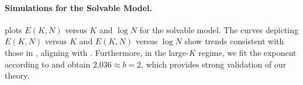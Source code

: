 \paragraph{Simulations for the Solvable Model.}  plots $E(K, N)$ versus $K$ and $\log N$ for the solvable model. The curves depicting $E(K,N)$ versus $K$ and $E(K,N)$ versus $\log N$ show trends consistent with those in , aligning with . 
Furthermore, in the large-$K$ regime, we fit the exponent according to  and obtain $2.036 \approx b = 2$, which provides strong validation of our theory.



